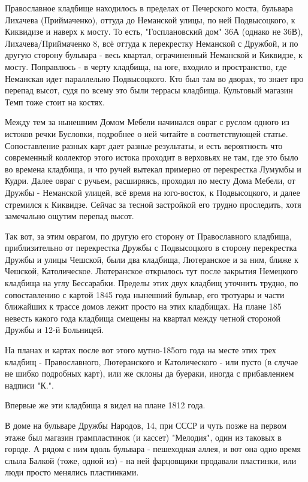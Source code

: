 Православное кладбище находилось в пределах от Печерского моста, бульвара Лихачева (Приймаченко), оттуда до Неманской улицы, по ней Подвысоцкого, к Киквидизе и наверх к мосту. То есть, "Госплановский дом" 36А (однако не 36В), Лихачева/Приймаченко 8, всё оттуда к перекрестку Неманской с Дружбой, и по другую сторону бульвара - весь квартал, ограчиненный Неманской и Киквидзе, к мосту. Поправлюсь - в черту кладбища, на юге, входило и пространство, где Неманская идет параллельно Подвысоцкого. Кто был там во дворах, то знает про перепад высот, судя по всему это были террасы кладбища. Культовый магазин Темп тоже стоит на костях.

Между тем за нынешним Домом Мебели начинался овраг с руслом одного из истоков речки Бусловки, подробнее о ней читайте в соответствующей статье. Сопоставление разных карт дает разные результаты, и есть вероятность что современный коллектор этого истока проходит в верховьях не там, где это было во времена кладбища, и что ручей вытекал примерно от перекрестка Лумумбы и Кудри. Далее овраг с ручьем, расширяясь, проходил по месту Дома Мебели, от Дружбы - Неманской улицей, всё время на юго-восток, к Подвысоцкого, и далее стремился к Киквидзе. Сейчас за тесной застройкой его трудно проследить, хотя замечально ощутим перепад высот.

Так вот, за этим оврагом, по другую его сторону от Православного кладбища, приблизительно от перекрестка Дружбы с Подвысоцкого в сторону перекрестка Дружбы и улицы Чешской, были два кладбища, Лютеранское и за ним, ближе к Чешской, Католическое. Лютеранское открылось тут после закрытия Немецкого кладбища на углу Бессарабки. Пределы этих двух кладбищ уточнить трудно, по сопоставлению с картой 1845 года нынешний бульвар, его тротуары и части ближайших к трассе домов лежит просто на этих кладбищах. На плане 185 невесть какого года кладбища смещены на квартал между четной стороной Дружбы и 12-й Больницей.

На планах и картах после вот этого мутно-185ого года на месте этих трех кладбищ - Православного, Лютеранского и Католического - или пусто (в случае не шибко подробных карт), или же склоны да буераки, иногда с прибавлением надписи "К.". 

Впервые же эти кладбища я видел на плане 1812 года.

В доме на бульваре Дружбы Народов, 14, при СССР и чуть позже на первом этаже был магазин грампластинок (и кассет) "Мелодия", один из таковых в городе. А рядом с ним вдоль бульвара - пешеходная аллея, и вот она одно время слыла Балкой (тоже, одной из) - на ней фарцовщики продавали пластинки, или люди просто менялись пластинками.\\

